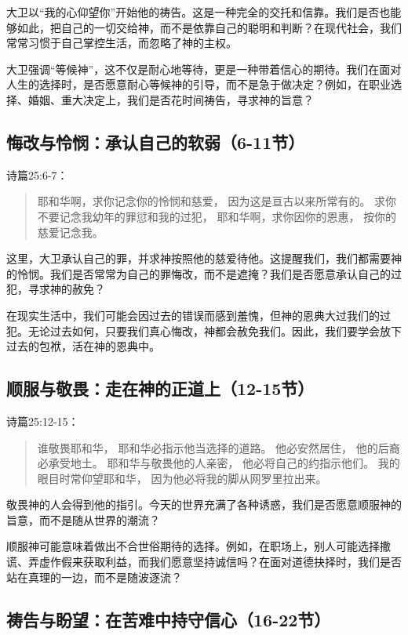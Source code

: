 \documentclass[a4paper, 12pt]{article}
\begin{document}
大卫以“我的心仰望你”开始他的祷告。这是一种完全的交托和信靠。我们是否也能够如此，把自己的一切交给神，而不是依靠自己的聪明和判断？在现代社会，我们常常习惯于自己掌控生活，而忽略了神的主权。

大卫强调“等候神”，这不仅是耐心地等待，更是一种带着信心的期待。我们在面对人生的选择时，是否愿意耐心等候神的引导，而不是急于做决定？例如，在职业选择、婚姻、重大决定上，我们是否花时间祷告，寻求神的旨意？

\subsection*{悔改与怜悯：承认自己的软弱（6-11节）}

诗篇25:6-7：
\begin{quote}
耶和华啊，求你记念你的怜悯和慈爱，
因为这是亘古以来所常有的。
求你不要记念我幼年的罪愆和我的过犯，
耶和华啊，求你因你的恩惠，
按你的慈爱记念我。
\end{quote}

这里，大卫承认自己的罪，并求神按照他的慈爱待他。这提醒我们，我们都需要神的怜悯。我们是否常常为自己的罪悔改，而不是遮掩？我们是否愿意承认自己的过犯，寻求神的赦免？

在现实生活中，我们可能会因过去的错误而感到羞愧，但神的恩典大过我们的过犯。无论过去如何，只要我们真心悔改，神都会赦免我们。因此，我们要学会放下过去的包袱，活在神的恩典中。

\subsection*{顺服与敬畏：走在神的正道上（12-15节）}

诗篇25:12-15：
\begin{quote}
谁敬畏耶和华，
耶和华必指示他当选择的道路。
他必安然居住，
他的后裔必承受地土。
耶和华与敬畏他的人亲密，
他必将自己的约指示他们。
我的眼目时常仰望耶和华，
因为他必将我的脚从网罗里拉出来。
\end{quote}

敬畏神的人会得到他的指引。今天的世界充满了各种诱惑，我们是否愿意顺服神的旨意，而不是随从世界的潮流？

顺服神可能意味着做出不合世俗期待的选择。例如，在职场上，别人可能选择撒谎、弄虚作假来获取利益，而我们愿意坚持诚信吗？在面对道德抉择时，我们是否站在真理的一边，而不是随波逐流？

\subsection*{祷告与盼望：在苦难中持守信心（16-22节）}
\end{document}
